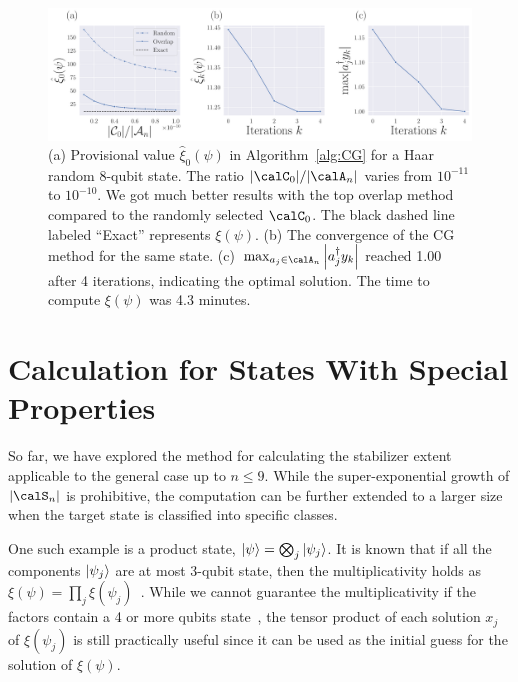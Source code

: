 \documentclass[aps,prx,onecolumn,superscriptaddress,nobibnotes,nofootinbib]{revtex4-2}
\begin{document}
\begin{figure}[t]
  \centering
  \includegraphics[width=\columnwidth]{imgs/CG_8.pdf}
  \caption{
    (a) Provisional value $\hat{\xi}_0(\psi)$ in Algorithm~\ref{alg:CG}
    for a Haar random 8-qubit state.
    The ratio $\abs{\calC_0}/\abs{\calA_n}$ varies from $10^{-11}$ to $10^{-10}$.
    We got much better results with the top overlap method compared to the randomly selected $\calC_0$.
    The black dashed line labeled ``Exact'' represents $\xi(\psi)$.
    (b) The convergence of the CG method for the same state.
    (c)~$\max_{a_j \in \calA_n} \abs{a_j^\dagger y_k}$ reached 1.00 after 4 iterations, indicating the optimal solution.
    The time to compute $\xi(\psi)$ was 4.3 minutes.
  }
  \label{fig:CG}
\end{figure}

\section{Calculation for States With Special Properties}
\label{sec:restrictedRealProblem}

So far, we have explored the method for calculating
the stabilizer extent applicable to the general case up to $n\leq 9$.
While the super-exponential growth of $\abs{\calS_n}$ is prohibitive, the computation can be further extended to a larger size when the target state is classified into specific classes.

One such example is a product state, $\ket{\psi} = \bigotimes_j \ket{\psi_j}$.
It is known that if all the components $\ket{\psi_j}$ are at most 3-qubit state, then the multiplicativity holds as $\xi(\psi) = \prod_j \xi(\psi_j)$~\cite{Bravyi2019simulationofquantum}.
While we cannot guarantee the multiplicativity if the factors contain a 4 or more qubits state~\cite {heimendahlStabilizerExtentNot2021}, the tensor product of each solution $x_j$ of $\xi(\psi_j)$ is still practically useful since it can be used as the initial guess for the solution of $\xi(\psi)$.
\end{document}
